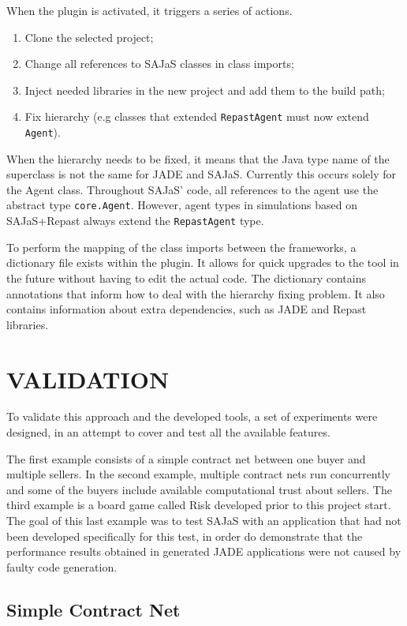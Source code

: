 \documentclass[a4paper,twoside]{article}
\begin{document}
When the plugin is activated, it triggers a series of actions.
\begin{enumerate}
  \item Clone the selected project;
  \item Change all references to SAJaS classes in class imports;
  \item Inject needed libraries in the new project and add them to the build path;
  \item Fix hierarchy (e.g classes that extended \texttt{RepastAgent} must now extend \texttt{Agent}).
\end{enumerate}

When the hierarchy needs to be fixed, it means that the Java type name of the superclass is not the same for JADE and SAJaS. Currently this occurs solely for the Agent class. Throughout SAJaS' code, all references to the agent use the abstract type \texttt{core.Agent}. However, agent types in simulations based on SAJaS+Repast always extend the \texttt{RepastAgent} type.

To perform the mapping of the class imports between the frameworks, a dictionary file exists within the plugin. It allows for quick upgrades to the tool in the future without having to edit the actual code. The dictionary contains annotations that inform how to deal with the hierarchy fixing problem. It also contains information about extra dependencies, such as JADE and Repast libraries.

\section{\uppercase{Validation}}
\label{sec:validation}

\noindent To validate this approach and the developed tools, a set of experiments were designed, in an attempt to cover and test all the available features.

The first example consists of a simple contract net between one buyer and multiple sellers. In the second example, multiple contract nets run concurrently and some of the buyers include available computational trust about sellers. The third example is a board game called Risk developed prior to this project start. The goal of this last example was to test SAJaS with an application that had not been developed specifically for this test, in order do demonstrate that the performance results obtained in generated JADE applications were not caused by faulty code generation.

\subsection{Simple Contract Net}
\end{document}
